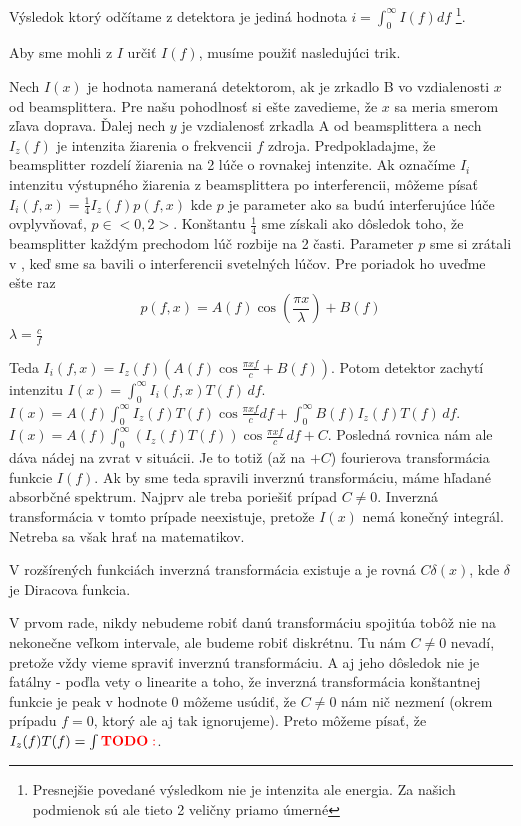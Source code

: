 Výsledok ktorý odčítame z detektora je jediná hodnota $i=\int_0^\infty I(f) df$
\footnote{Presnejšie povedané výsledkom nie je intenzita ale energia.
Za našich podmienok sú ale tieto 2 veličny priamo úmerné}.

Aby sme mohli z $I$ určiť $I(f)$, musíme použiť nasledujúci trik.

Nech $I(x)$ je hodnota nameraná detektorom, ak je zrkadlo B vo
vzdialenosti $x$ od beamsplittera. Pre našu pohodlnosť si ešte zavedieme,
že $x$ sa meria smerom zľava doprava. Ďalej nech $y$ je vzdialenosť zrkadla
A od beamsplittera a nech $I_z(f)$ je intenzita žiarenia o frekvencii
$f$ zdroja. Predpokladajme, že beamsplitter rozdelí žiarenia na 2 lúče
o rovnakej intenzite. Ak označíme $I_i$ intenzitu výstupného
žiarenia z beamsplittera po interferencii, môžeme písať
$I_i(f,x)=\frac{1}{4} I_z(f) p(f,x)$ kde $p$ je parameter ako sa budú
interferujúce lúče ovplyvňovať, $p \in <0,2>$. 
Konštantu $\frac{1}{4}$ sme získali ako dôsledok toho, že beamsplitter
každým prechodom lúč rozbije na 2 časti.
Parameter $p$ sme si zrátali v \todo{}, keď sme sa
bavili o interferencii svetelných lúčov. Pre poriadok ho uveďme ešte
raz
\begin{equation}
p(f,x)=A(f) \cos(\frac{\pi x}{\lambda}) + B(f)
\end{equation}
$\lambda=\frac{c}{f}$

Teda $I_i(f,x)= I_z(f) (A(f) \cos \frac{\pi x f}{c} + B(f))$. Potom
detektor zachytí intenzitu 
$I(x)=\int_0^\infty I_i(f,x) T(f)\,df$.
$I(x)=A(f) \int_0^\infty I_z(f) T(f) \cos \frac{\pi x f}{c}
df +\int_0^\infty B(f) I_z(f) T(f)\,df$.
$I(x)=A(f) \int_0^\infty (I_z(f) T(f)) \cos \frac{\pi x f}{c}\,df +
C$. Posledná rovnica nám ale dáva nádej na zvrat v situácii.
Je to totiž (až na $+C$) fourierova transformácia
funkcie $I(f)$. Ak by sme teda spravili inverznú transformáciu,
máme hľadané absorbčné spektrum. Najprv ale treba poriešiť
prípad $C\not=0$. 
Inverzná transformácia v tomto prípade
neexistuje, pretože $I(x)$ nemá konečný integrál. Netreba sa však hrať
na matematikov.
\begin{poznamka}
 V rozšírených funkciách inverzná transformácia existuje a je rovná
  $C \delta(x)$, kde $\delta$ je Diracova funkcia.
\end{poznamka}

V prvom rade, nikdy nebudeme robiť danú transformáciu
spojitúa tobôž nie na nekonečne veľkom intervale, ale budeme robiť diskrétnu. 
Tu nám $C\not=0$ nevadí, pretože vždy vieme spraviť inverznú transformáciu. 
A aj jeho dôsledok nie je fatálny - poďla vety o linearite \todo{} a toho, 
že inverzná transformácia konštantnej funkcie 
je peak v hodnote 0\todo{} môžeme 
usúdiť, že $C\not=0$ nám nič nezmení (okrem prípadu $f=0$, ktorý ale
aj tak ignorujeme).
Preto môžeme písať, že
$I_z(f) T(f) = \int {\bf {\color{red} TODO:}}$.



